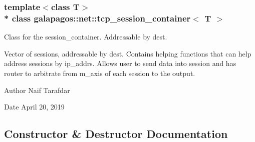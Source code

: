 \subsubsection*{template$<$class T$>$\\*
class galapagos\+::net\+::tcp\+\_\+session\+\_\+container$<$ T $>$}

Class for the session\+\_\+container. Addressable by dest. 

Vector of sessions, addressable by dest. Contains helping functions that can help address sessions by ip\+\_\+addrs. Allows user to send data into session and has router to arbitrate from m\+\_\+axis of each session to the output. \begin{DoxyAuthor}{Author}
Naif Tarafdar 
\end{DoxyAuthor}
\begin{DoxyDate}{Date}
April 20, 2019 
\end{DoxyDate}


\subsection{Constructor \& Destructor Documentation}

